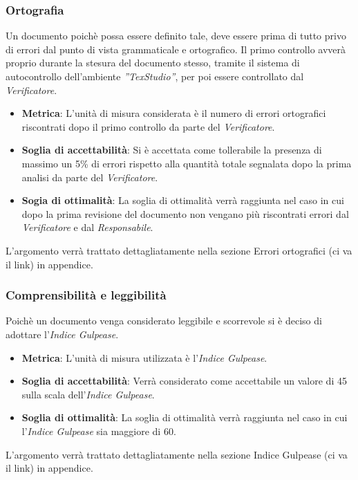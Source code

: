 \subsubsection{Ortografia}
Un documento poichè possa essere definito tale, deve essere prima di tutto privo di errori dal punto di vista grammaticale e ortografico. 
Il primo controllo avverà proprio durante la stesura del documento stesso, tramite il sistema di autocontrollo dell'ambiente  \emph{''TexStudio''}, per poi essere controllato dal  \emph{Verificatore}.
\begin{itemize}
	\item \textbf{Metrica}: L'unità di misura considerata è il numero di errori ortografici riscontrati dopo il primo controllo da parte del \emph{Verificatore}.
	\item \textbf{Soglia di accettabilità}: Si è accettata come tollerabile la presenza di massimo un 5\% di errori rispetto alla quantità totale segnalata dopo la prima analisi da parte del \emph{Verificatore}.
	\item \textbf{Sogia di ottimalità}: La soglia di ottimalità verrà raggiunta nel caso in cui dopo la prima revisione del documento non vengano più riscontrati errori dal \emph{Verificatore} e dal \emph{Responsabile}.
\end{itemize}
L'argomento verrà trattato dettagliatamente nella sezione Errori ortografici (ci va il link) in appendice.
\subsubsection{Comprensibilità e leggibilità}
Poichè un documento venga considerato leggibile e scorrevole si è deciso di adottare l'\emph{Indice Gulpease}. 
\begin{itemize}
	\item \textbf{Metrica}: L'unità di misura utilizzata è l'\emph{Indice Gulpease}.
	\item \textbf{Soglia di accettabilità}: Verrà considerato come accettabile un valore di 45 sulla scala dell'\emph{Indice Gulpease}.
	\item \textbf{Soglia di ottimalità}: La soglia di ottimalità verrà raggiunta nel caso in cui l'\emph{Indice Gulpease} sia maggiore di 60.
\end{itemize}
L'argomento verrà trattato dettagliatamente nella sezione Indice Gulpease (ci va il link) in appendice.
